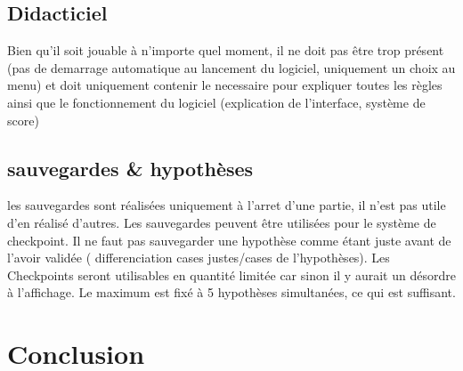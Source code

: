 \documentclass{report}
\begin{document}
	\section{Didacticiel}
		Bien qu'il soit jouable à n'importe quel moment, il ne doit pas être trop présent (pas de demarrage automatique au lancement du logiciel, uniquement un choix au menu) et doit uniquement contenir le necessaire pour expliquer toutes les règles ainsi que le fonctionnement du logiciel (explication de l'interface, système de score)
	
	\section{sauvegardes & hypothèses}
		les sauvegardes sont réalisées uniquement à l'arret d'une partie, il n'est pas utile d'en réalisé d'autres. Les sauvegardes peuvent être utilisées pour le système de checkpoint. Il ne faut pas sauvegarder une hypothèse comme étant juste avant de l'avoir validée ( differenciation cases justes/cases de l'hypothèses). Les Checkpoints seront utilisables en quantité limitée car sinon il y aurait un désordre à l'affichage. Le maximum est fixé à 5 hypothèses simultanées, ce qui est suffisant.
		
\chapter{Conclusion}
		
		
\end{document}
